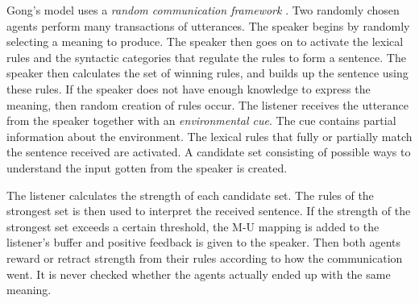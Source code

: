 Gong's model uses a \textit{random communication framework} \citep[section 3.4]{gong2011simulating}. Two randomly chosen agents perform many transactions of utterances. The speaker begins by randomly selecting a meaning to produce. The speaker then goes on to activate the lexical rules and the syntactic categories that regulate the rules to form a sentence. The speaker then calculates the set of winning rules, and builds up the sentence using these rules. If the speaker does not have enough knowledge to express the meaning, then random creation of rules occur.
The listener receives the utterance from the speaker together with an \textit{environmental cue}. The cue contains partial information about the environment. The lexical rules that fully or partially match the sentence received are activated. A candidate set consisting of possible ways to understand the input gotten from the speaker is created.  
\begin{comment}
\begin{enumerate}
    \item If the cue and some set of the rules match perfectly, they are combined into a candidate set.
    
    \item If the rules and the cue do not make a perfect meaning, but the constituents of the rules match the constituents in the cue, then they are combined into meaning. Gongs example of this is as follows: The linguistic rule interpreted from the sentence is Chase<tiger, \#> and the cues meaning is Chase<tiger, sheep>. These rules do not match perfectly, but they will be combined into the meaning Chase<tiger, sheep>, which is the meaning of this candidate set.
    
    \item If none of the linguistic rules from the sentence received can be combined with the cue, then the cue becomes a candidate set. Gongs example here is: Say we have the rule Chase<tiger, sheep> from the utterance, but the cue gives the rule Fight<tiger, sheep>. These rules can not be combined, and therefore, the cue becomes the meaning.
\end{enumerate}
\end{comment}
The listener calculates the strength of each candidate set. The rules of the strongest set is then used to interpret the received sentence. If the strength of the strongest set exceeds a certain threshold, the M-U mapping is added to the listener's buffer and positive feedback is given to the speaker. Then both agents reward or retract strength from their rules according to how the communication went. It is never checked whether the agents actually ended up with the same meaning.

